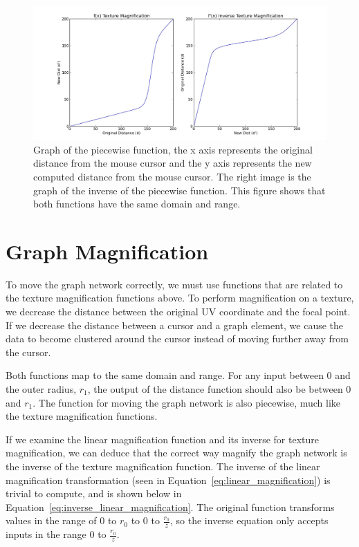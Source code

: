 \begin{figure}[htp] \centering
    \includegraphics[width=0.8\linewidth]{img/full_graph.jpg}
    \caption[Distance Function]{Graph of the piecewise function, the x axis represents the original distance from 
    the mouse cursor and the y axis represents the new computed distance from the mouse cursor. The right image 
    is the graph of the inverse of the piecewise function. This figure shows that both functions have the same 
    domain and range.}
    \label{fig:texture_mag_graph}
\end{figure}

\section{Graph Magnification}
\label{section:graph_magnification}
To move the graph network correctly, we must use functions that are related to the texture magnification 
functions above. To perform magnification on a texture, we decrease the distance between the original UV coordinate and the focal point. If we decrease the distance between a cursor and a graph element, we cause the data to become clustered around the cursor instead of moving further away from the cursor.

Both functions map to the same domain and range. For any input between 0 and the outer radius, $r_1$, the output 
of the distance function should also be between 0 and $r_1$. The function for moving the graph network is also 
piecewise, much like the texture magnification functions.

If we examine the linear magnification function and its inverse for texture magnification, we can deduce that the correct way magnify the graph network is the 
inverse of the texture magnification function. The inverse of the linear magnification transformation (seen in 
Equation~\ref{eq:linear_magnification}) is trivial to compute, and is shown below in 
Equation~\ref{eq:inverse_linear_magnification}. The original function transforms values in the range of 0 to 
$r_0$ to 0 to $\frac{r_0}{z}$, so the inverse equation only accepts inputs in the range 0 to $\frac{r_0}{z}$.

